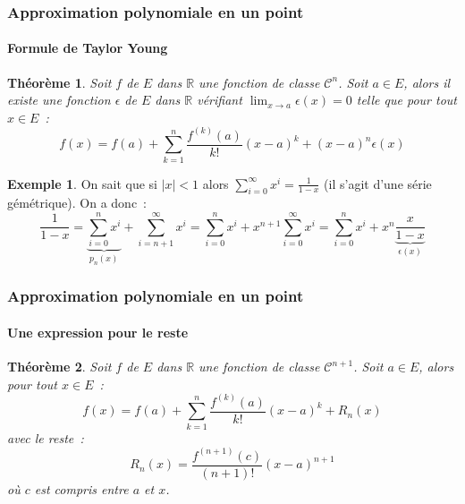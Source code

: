 \documentclass[10pt,notheorems]{beamer}
\theoremstyle{plain}
\newtheorem{theorem}{Théorème}
\theoremstyle{definition} %
\newtheorem{example}{Exemple}
\begin{document}
\begin{frame}
  \frametitle{Approximation polynomiale en un point}
  \framesubtitle{Formule de Taylor Young}
  \hypertarget{slide_taylor_8}{}

  \bigskip

  \begin{theorem}
    Soit $f$ de $E$ dans $\mathbb R$ une fonction de classe $\mathcal C^n$. Soit $a\in E$, alors il existe une fonction $\epsilon$ de $E$ dans $\mathbb R$ vérifiant $\lim_{x\rightarrow a}\epsilon(x) = 0$ telle que pour tout $x\in E$~:
    \[
      f(x) = f(a) + \sum_{k=1}^n\frac{f^{(k)}(a)}{k!}(x-a)^k + (x-a)^n\epsilon(x)
    \]
  \end{theorem}

  \begin{example}
    On sait que si $|x|<1$ alors $\sum_{i=0}^\infty x^i = \frac{1}{1-x}$ (il s'agit d'une série gémétrique). On a donc~:
    {\small
      \[
        \frac{1}{1-x} = \underbrace{\sum_{i=0}^nx^i}_{p_n(x)} + \sum_{i=n+1}^\infty x^i
        = \sum_{i=0}^nx^i + x^{n+1}\sum_{i=0}^\infty x^i
        = \sum_{i=0}^nx^i + x^{n}\underbrace{\frac{x}{1-x}}_{\epsilon(x)}
      \]}
  \end{example}

\end{frame}


\begin{frame}
  \frametitle{Approximation polynomiale en un point}
  \framesubtitle{Une expression pour le reste}
  \hypertarget{slide_taylor_9}{}
  \bigskip

  \begin{theorem}\label{thm:taylor}
    Soit $f$ de $E$ dans $\mathbb R$ une fonction de classe $\mathcal C^{n+1}$. Soit $a\in E$, alors pour tout $x\in E$~:
    \[
      f(x) = f(a) + \sum_{k=1}^n\frac{f^{(k)}(a)}{k!}(x-a)^k + R_n(x)
    \]
    avec le reste~:
    \[
      R_n(x) = \frac{f^{(n+1)}(c)}{(n+1)!}(x-a)^{n+1}
    \]
    où $c$ est compris entre $a$ et $x$.
  \end{theorem}

\end{frame}
\end{document}
